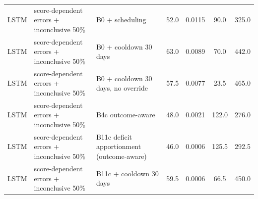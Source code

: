 \begin{longtable}{lp{5.2cm}p{4.4cm}cccc}
LSTM & score-dependent errors + inconclusive 50\% & B0 + scheduling & 52.0 & 0.0115 & 90.0 & 325.0 \\
LSTM & score-dependent errors + inconclusive 50\% & B0 + cooldown 30 days & 63.0 & 0.0089 & 70.0 & 442.0 \\
LSTM & score-dependent errors + inconclusive 50\% & B0 + cooldown 30 days, no override & 57.5 & 0.0077 & 23.5 & 465.0 \\
LSTM & score-dependent errors + inconclusive 50\% & B4c outcome-aware & 48.0 & 0.0021 & 122.0 & 276.0 \\
LSTM & score-dependent errors + inconclusive 50\% & B11c deficit apportionment (outcome-aware) & 46.0 & 0.0006 & 125.5 & 292.5 \\
LSTM & score-dependent errors + inconclusive 50\% & B11c + cooldown 30 days & 59.5 & 0.0006 & 66.5 & 450.0 \\
\bottomrule
\end{longtable}

